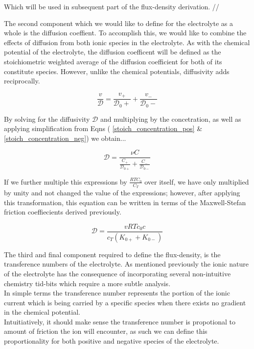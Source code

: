 \documentclass[lettersize,journal]{IEEEtran}
\begin{document}
Which will be used in subsequent part of the flux-density derivation. //

The second component which we would like to define for the electrolyte as a whole is the diffusion coeffient. To accomplish this, we would like to combine the effects of diffusion from both ionic species in the electrolyte. As with the chemical potential of the electrolyte, the diffusion coefficent will be defined as the stoichiometric weighted average of the diffusion coefficient for both of its constitute species. However, unlike the chemical potentials, diffusivity adds reciprocally.

\begin{equation}
\frac{v}{\mathscr{D}}=\frac{v_{+}}{\mathscr{D}_{0}+}+\frac{v_{-}}{\mathscr{D}_{0}-}
\end{equation}

By solving for the diffusivity $\mathscr{D}$ and multiplying by the concetration, as well as applying simplification from Eqns ( \ref{stoich_concentration_pos} \& \ref{stoich_concentration_neg}) we obtain...

\begin{equation}
\mathscr{D}=\frac{\nu C}{\frac{C_{+}}{\mathscr{D}_{0+}}+\frac{C_{-}}{\mathscr{D}_{0-}}}
\end{equation}

If we further multiple this expressions by $\frac{RTC_0}{C_T}$ over itself, we have only multiplied by unity and not changed the value of the expressions; however, after applying this transformation, this equation can be written in terms of the Maxwell-Stefan friction coeffiecients derived previously.

\begin{equation}
\mathscr{D}=\frac{v R T c_{0} c}{c_{T}\left(K_{0+}+K_{0-}\right)}
\end{equation}

The third and final component required to define the flux-density, is the transference numbers of the electrolyte. As mentioned previously the ionic nature of the electrolyte has the consequence of incorporating several non-intuitive chemistry tid-bits which require a more subtle analysis. \\

In simple terms the transference number represents the portion of the ionic current which is being carried by a specific species when there exists no gradient in the chemical potential. \\

Intuitiatively, it should make sense the transference number is propotional to amount of friction the ion will encounter, as such we can define this proportionality for both positive and negative species of the electrolyte.
\end{document}
